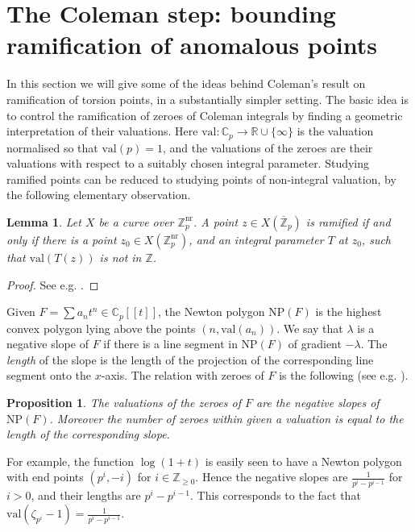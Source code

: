 \documentclass{amsart}
\def\Z{\mathbb Z}
\def\C{\mathbb C}
\newcommand{\val}{\mathrm{val}}
\newtheorem{lemma}{Lemma}
\newtheorem{proposition}{Proposition}
\theoremstyle{definition}
\newcommand{\NP}{\mathrm{NP}}
\newcommand{\R}{\mathbb{R}}
\begin{document}
\section{The Coleman step: bounding ramification of anomalous points}\label{sec:C}
In this section we will give some of the ideas behind Coleman's result \cite{coleman:ramified} on ramification of torsion points, in a substantially simpler setting. The basic idea is to control the ramification of zeroes of Coleman integrals by finding a geometric interpretation of their valuations. Here $\val :\C _p \to \R \cup \{ \infty \}$ is the valuation normalised so that $\val (p)=1$, and the valuations of the zeroes are their valuations with respect to a suitably chosen integral parameter. Studying ramified points can be reduced to studying points of non-integral valuation, by the following elementary observation.
\begin{lemma}
Let $X$ be a curve over $\Z _p ^{\mathrm{nr}}$. A point $z\in X(\overline{\Z }_p )$ is ramified if and only if there is a point $z_0 \in X(\Z _p ^{\mathrm{nr}})$, and an integral parameter $T$ at $z_0 $, such that $\val (T(z))$ is not in $\Z $.
\end{lemma}
\begin{proof}
See e.g. \cite[3.2]{DP}.
\end{proof}

Given $F=\sum a_n t^n \in \C _p [\! [t]\! ]$, the Newton polygon $\mathrm{NP}(F)$ is the highest convex polygon lying above the points $(n,\val (a_n ))$. We say that $\lambda $ is a negative slope of $F$ if there is a line segment in $\NP (F)$ of gradient $-\lambda $. The \textit{length} of the slope is the length of the projection of the corresponding line segment onto the $x$-axis. The relation with zeroes of $F$ is the following (see e.g. \cite[IV.4]{koblitz}).
\begin{proposition}
The valuations of the zeroes of $F$ are the negative slopes of $\mathrm{NP}(F)$. Moreover the number of zeroes within given a valuation is equal to the length of the corresponding slope.
\end{proposition}
For example, the function $\log (1+t)$ is easily seen to have a Newton polygon with end points $(p^i ,-i)$ for $i\in \Z _{\geq 0}$. Hence the negative slopes are $\frac{1}{p^i-p^{i-1}}$ for $i>0$, and their lengths are $p^i -p^{i-1}$. This corresponds to the fact that $\val (\zeta _{p^i}-1)=\frac{1}{p^i-p^{i-1}}$.
\end{document}

